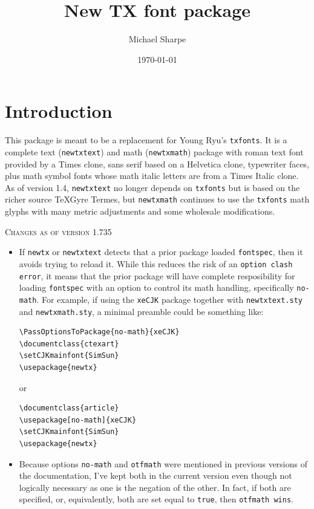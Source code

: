 \documentclass[\fsc]{article}
\title{New TX font package}
\author{Michael Sharpe}
\date{\today}  %
\theoremstyle{oldplain}
\theoremstyle{plain}
\begin{document}
\makeatletter
\makeatother
\maketitle
%
\section{Introduction}
This package is meant to be a replacement for Young Ryu's {\tt txfonts}. It is  a complete text ({\tt newtxtext}) and math ({\tt newtxmath}) package with roman text font provided by  a Times clone, sans serif based on a \textsf{Helvetica} clone, typewriter faces, plus math symbol fonts whose math italic letters are from a Times Italic clone. As of version 1.4, {\tt newtxtext} no longer depends on {\tt txfonts} but is based on the richer source \textsf{TeXGyre Termes}, but {\tt newtxmath} continues to use the {\tt txfonts} math glyphs with many metric adjustments and some wholesale modifications.

\textsc{Changes as of version 1.735}
\begin{itemize}
\item
If {\tt newtx} or {\tt newtxtext} detects that a prior package loaded {\tt fontspec}, then it avoids trying to reload it. While this reduces the risk of an {\tt option clash error}, it means that the prior package will have complete resposibility for loading {\tt fontspec} with an option to control its math handling, specifically {\tt no-math}. For example, if using the {\tt xeCJK} package together with {\tt newtxtext.sty} and {\tt newtxmath.sty}, a minimal preamble could be something like:
\begin{verbatim}
\PassOptionsToPackage{no-math}{xeCJK}
\documentclass{ctexart}
\setCJKmainfont{SimSun}
\usepackage{newtx}
\end{verbatim}
or
\begin{verbatim}
\documentclass{article}
\usepackage[no-math]{xeCJK}
\setCJKmainfont{SimSun}
\usepackage{newtx}
\end{verbatim}
\item Because options {\tt no-math} and {\tt otfmath} were mentioned in previous versions of the documentation, I've kept both in the current version even though not logically necessary as one is the negation of the other. In fact, if both are specified, or, equivalently, both are set equal to {\tt true}, then {\tt otfmath wins}.
\end{itemize}
\end{document}
